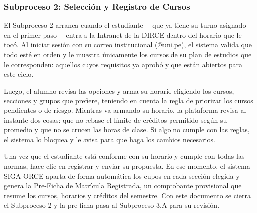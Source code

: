 \subsubsection{Subproceso 2: Selección y Registro de Cursos}



El Subproceso 2 arranca cuando el estudiante —que ya tiene su turno asignado en el primer paso— entra a la Intranet de la DIRCE dentro del horario que le tocó. Al iniciar sesión con su correo institucional (@uni.pe), el sistema valida que todo esté en orden y le muestra únicamente los cursos de su plan de estudios que le corresponden: aquellos cuyos requisitos ya aprobó y que están abiertos para este ciclo.

Luego, el alumno revisa las opciones y arma su horario eligiendo los cursos, secciones y grupos que prefiere, teniendo en cuenta la regla de priorizar los cursos pendientes o de riesgo. Mientras va armando su horario, la plataforma revisa al instante dos cosas: que no rebase el límite de créditos permitido según su promedio y que no se crucen las horas de clase. Si algo no cumple con las reglas, el sistema lo bloquea y le avisa para que haga los cambios necesarios.

Una vez que el estudiante está conforme con su horario y cumple con todas las normas, hace clic en registrar y enviar su propuesta. En ese momento, el sistema SIGA-ORCE aparta de forma automática los cupos en cada sección elegida y genera la Pre-Ficha de Matrícula Registrada, un comprobante provisional que resume los cursos, horarios y créditos del semestre. Con este documento se cierra el Subproceso 2 y la pre-ficha pasa al Subproceso 3.A para su revisión.

